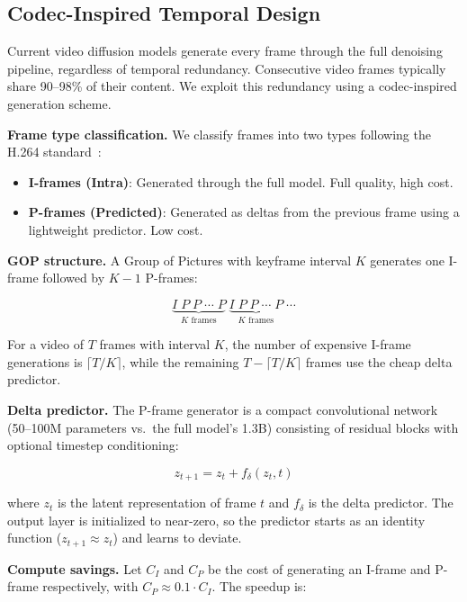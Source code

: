 \documentclass[11pt]{article}
\begin{document}
\subsection{Codec-Inspired Temporal Design}
\label{sec:codec}

Current video diffusion models generate every frame through the full denoising pipeline, regardless of temporal redundancy. Consecutive video frames typically share 90--98\% of their content. We exploit this redundancy using a codec-inspired generation scheme.

\textbf{Frame type classification.} We classify frames into two types following the H.264 standard~\citep{wiegand2003h264}:

\begin{itemize}[leftmargin=2em, itemsep=0.1em]
  \item \textbf{I-frames (Intra)}: Generated through the full model. Full quality, high cost.
  \item \textbf{P-frames (Predicted)}: Generated as deltas from the previous frame using a lightweight predictor. Low cost.
\end{itemize}

\textbf{GOP structure.} A Group of Pictures with keyframe interval $K$ generates one I-frame followed by $K-1$ P-frames:

\begin{equation}
  \underbrace{I \; P \; P \; \cdots \; P}_{K \text{ frames}} \; \underbrace{I \; P \; P \; \cdots \; P}_{K \text{ frames}} \; \cdots
\end{equation}

For a video of $T$ frames with interval $K$, the number of expensive I-frame generations is $\lceil T/K \rceil$, while the remaining $T - \lceil T/K \rceil$ frames use the cheap delta predictor.

\textbf{Delta predictor.} The P-frame generator is a compact convolutional network (50--100M parameters vs.\ the full model's 1.3B) consisting of residual blocks with optional timestep conditioning:

\begin{equation}
  z_{t+1} = z_t + f_\delta(z_t, t)
\end{equation}

where $z_t$ is the latent representation of frame $t$ and $f_\delta$ is the delta predictor. The output layer is initialized to near-zero, so the predictor starts as an identity function ($z_{t+1} \approx z_t$) and learns to deviate.

\textbf{Compute savings.} Let $C_I$ and $C_P$ be the cost of generating an I-frame and P-frame respectively, with $C_P \approx 0.1 \cdot C_I$. The speedup is:
\end{document}
